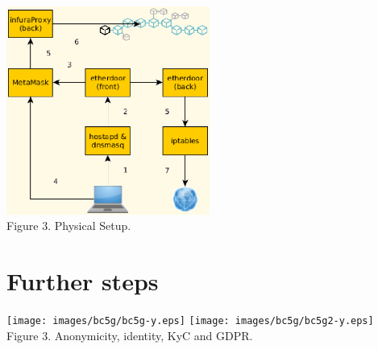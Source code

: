 \documentclass[12pt]{amsart}
\begin{document}
\begin{multicols}{2}
\begin{center}
  \includegraphics[keepaspectratio, width=0.5\textwidth]{images/con-flow-y.eps}
\\
Figure 3. Physical Setup.
\\
\end{center}






\section{Further steps}

\end{multicols}
\begin{center}
  \texttt{[image: images/bc5g/bc5g-y.eps]}
  \texttt{[image: images/bc5g/bc5g2-y.eps]}
\\
Figure 3. Anonymicity, identity, KyC and GDPR.
\\
\end{center}
\begin{multicols}{2}

\end{multicols}
\end{document}
